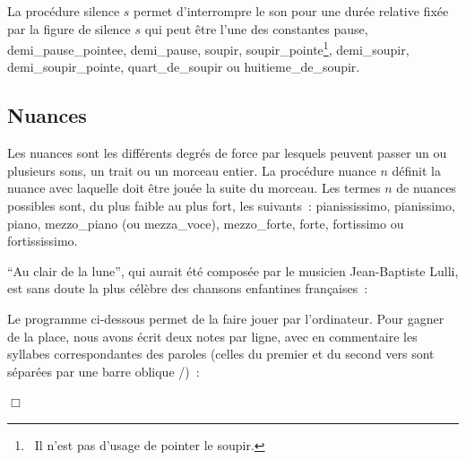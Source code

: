 La procédure {\idt silence $s$} permet d'interrompre le son pour une durée re\-la\-ti\-ve fixée par
la figure de silence $s$ qui peut être l'une des constantes
  {\idt pause},
  {\idt demi\_pause\_pointee},
  {\idt demi\_pause},
  {\idt soupir},
  {\idt sou\-pir\_\-poin\-te}\footnote{\ Il n'est pas d'usage de pointer le soupir.},
  {\idt de\-mi\_\-sou\-pir},
  {\idt demi\_soupir\_pointe},
  {\idt quart\_de\_soupir}
ou  {\idt huitieme\_de\_soupir}.

\subsection{Nuances}

Les nuances sont les différents degrés de force par lesquels peuvent passer un ou plusieurs sons, un trait
ou un morceau entier. La procédure {\idt nuance $n$} définit la nuance avec laquelle doit être jouée
la suite du morceau. Les termes $n$ de nuances possibles sont, du plus faible au plus fort, les suivants~:
{\idt pia\-nis\-sis\-si\-mo},
{\idt pia\-nis\-si\-mo},
{\idt piano},
{\idt mezzo\_piano} (ou {\idt mezza\_voce}),
{\idt mezzo\_forte},
{\idt forte},
{\idt fortissimo} ou
{\idt for\-tis\-sis\-si\-mo}.

\begin{exemple}{\rm
``Au clair de la lune'', qui aurait été composée par le musicien Jean-Baptiste Lulli,
est sans doute la plus célèbre des chansons enfantines françaises~:



\noindent Le programme ci-dessous permet de la faire jouer par l'ordinateur. Pour
gagner de la place, nous avons écrit deux notes par ligne, avec en commentaire les syllabes
correspondantes des paroles (celles du premier et du second vers sont séparées par une barre
oblique {\cmt /})~:

 
\noindent $\Box$ }\end{exemple}


